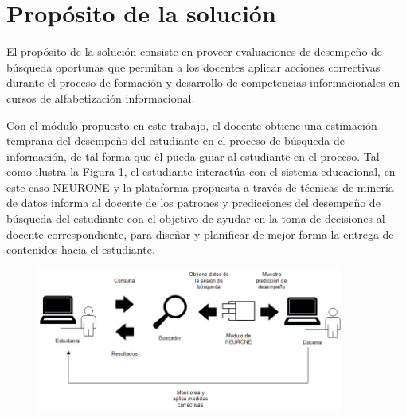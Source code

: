 \section{Propósito de la solución}
\label{sec:proposito-solucion}
El propósito de la solución consiste en proveer evaluaciones de desempeño de búsqueda oportunas que permitan a los docentes aplicar acciones correctivas durante el proceso de formación y desarrollo de competencias informacionales en cursos de alfabetización informacional.

Con el módulo propuesto en este trabajo, el docente obtiene una estimación temprana del desempeño del estudiante en el proceso de búsqueda de información, de tal forma que él pueda guiar al estudiante en el proceso. Tal como ilustra la Figura \ref{fig:docente_estudiante}, el estudiante interactúa con el sistema educacional, en este caso NEURONE y la plataforma propuesta a través de técnicas de minería de datos informa al docente de los patrones y predicciones del desempeño de búsqueda del estudiante con el objetivo de ayudar en la toma de decisiones al docente correspondiente, para diseñar y planificar de mejor forma la entrega de contenidos hacia el estudiante.

\begin{figure}[H]
	\centering
	\includegraphics[width=0.9\textwidth]{03_GraphicFiles/monitor.png}
	\label{fig:docente_estudiante}
\end{figure}
